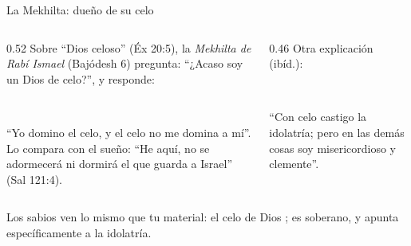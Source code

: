 \begin{frame}{La Mekhilta: dueño de su celo}
\begin{columns}[t,onlytextwidth]
\begin{column}{0.52\textwidth}\small
Sobre ``Dios celoso'' (Éx 20:5), la \emph{Mekhilta de Rabí Ismael} (Bajódesh 6) pregunta: ``¿Acaso soy un Dios de celo?'', y responde:
\begin{center}\\ \end{center}
``Yo domino el celo, y el celo no me domina a mí''. Lo compara con el sueño: ``He aquí, no se adormecerá ni dormirá el que guarda a Israel'' (Sal 121:4).
\end{column}
\begin{column}{0.46\textwidth}\small
Otra explicación (ibíd.):
\begin{center}\\ \end{center}
``Con celo castigo la idolatría; pero en las demás cosas soy misericordioso y clemente''.\par\smallskip
{}
\end{column}
\end{columns}\par\medskip
\small\RaggedRight Los sabios ven lo mismo que tu material: el celo de Dios ; es soberano, y apunta específicamente a la idolatría.
\end{frame}

